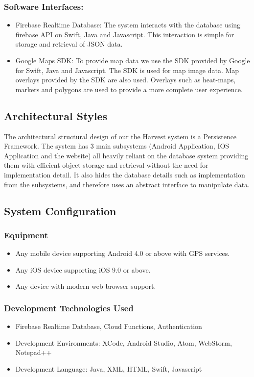 \documentclass[11pt]{article}
\begin{document}
\subsubsection{Software Interfaces:}
\begin{itemize}
\item Firebase Realtime Database: The system interacts with the database using firebase API on Swift, Java and Javascript. This interaction is simple for storage and retrieval of JSON data.
\item Google Maps SDK: To provide map data we use the SDK provided by Google for Swift, Java and Javascript. The SDK is used for map image data. Map overlays provided by the SDK are also used. Overlays such as heat-maps, markers and polygons are used to provide a more complete user experience.
\end{itemize}

\subsection{Architectural Styles}
The architectural structural design of our the Harvest system is a Persistence Framework. The system has 3 main subsystems (Android Application, IOS Application and the website) all heavily reliant on the database system providing them with efficient object storage and retrieval without the need for implementation detail. It also hides the database details such as implementation from the subsystems, and  therefore uses an abstract interface to manipulate data.



\subsection{System Configuration}

\subsubsection{Equipment}
\begin{itemize}
\item Any mobile device supporting Android 4.0 or above with GPS services.
\item Any iOS device supporting iOS 9.0 or above.
\item Any device with modern web browser support.
\end{itemize}

\subsubsection{Development Technologies Used}
\begin{itemize}
\item Firebase Realtime Database, Cloud Functions, Authentication
\item Development Environments: XCode, Android Studio, Atom, WebStorm, Notepad++
\item Development Language: Java, XML, HTML, Swift, Javascript
\end{itemize}
\end{document}
